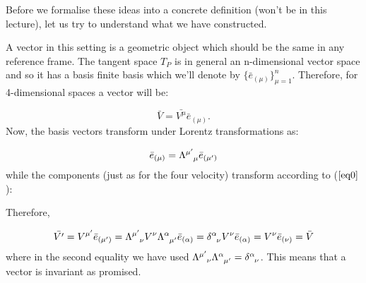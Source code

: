 \documentclass[11pt]{article}
\theoremstyle{plain}
\begin{document}
Before we formalise these ideas into a concrete definition (won't be in this lecture), let us try to understand what we have constructed. 

A vector in this setting is a geometric object which should be the same in any reference frame. The tangent space $T_{P}$ is in general an n-dimensional vector space and so it has a basis finite basis which we’ll denote by $\{\bar{e}_{(\mu)} \}_{\mu=1} ^{n}$. Therefore, for 4-dimensional spaces a vector will be:

\begin{equation}
\bar{V} = \bar{V^{\mu}} \bar{e}_{(\mu)}.
\end{equation}
Now, the basis vectors transform under Lorentz transformations as:

\begin{equation}
\bar{e}_{(\mu)} = \tensor{\Lambda}{^{\mu'}_\mu} \bar{e}_{(\mu')}
\end{equation}
while the components (just as for the four velocity) transform according to ($\ref{eq0}$):

Therefore, 

\begin{equation}
\bar{V'} = V^{\mu'} \bar{e}_{(\mu')} = \tensor{\Lambda}{^{\mu'}_\nu} V^{\nu}  \tensor{\Lambda}{^\alpha_{\mu'}} \bar{e}_{(\alpha)} =  \tensor{\delta}{^\alpha_\nu} V^{\nu}  \bar{e}_{(\alpha)}  =  V^{\nu}  \bar{e}_{(\nu)} = \bar{V} 
\end{equation}
where in the second equality we have used $\tensor{\Lambda}{^{\mu'}_\nu} \tensor{\Lambda}{^\alpha_{\mu'}} = \tensor{\delta}{^\alpha_\nu}$.
This means that a vector is invariant as promised.
\end{document}

